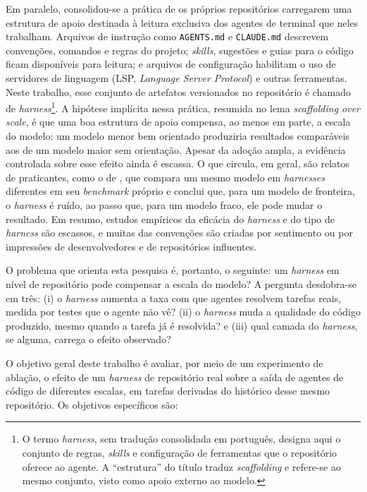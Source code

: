 Em paralelo, consolidou-se a prática de os próprios repositórios carregarem uma
estrutura de apoio destinada à leitura exclusiva dos agentes de terminal que neles trabalham. Arquivos de instrução
como \texttt{AGENTS.md} \cite{agentsmd2025} e \texttt{CLAUDE.md}
\cite{anthropic2025bestpractices} descrevem convenções, comandos e regras do
projeto; \textit{skills}, sugestões e guias para o código ficam disponíveis para leitura; e arquivos de configuração habilitam o uso de servidores de linguagem (LSP,
\textit{Language Server Protocol}) e outras ferramentas. Neste trabalho, esse
conjunto de artefatos versionados no repositório é chamado de
\textit{harness}\footnote{O termo \textit{harness}, sem tradução consolidada em
português, designa aqui o conjunto de regras, \textit{skills} e configuração de
ferramentas que o repositório oferece ao agente. A ``estrutura'' do título
traduz \textit{scaffolding} e refere-se ao mesmo conjunto, visto como apoio
externo ao modelo.}. A hipótese implícita nessa prática, resumida no
lema \textit{scaffolding over scale}, é que uma boa estrutura de apoio compensa,
ao menos em parte, a escala do modelo: um modelo menor bem orientado produziria
resultados comparáveis aos de um modelo maior sem orientação. Apesar da adoção
ampla, a evidência controlada sobre esse efeito ainda é escassa. O que
circula, em geral, são relatos de praticantes, como o de
, que compara um mesmo modelo em \textit{harnesses}
diferentes em seu \textit{benchmark} próprio e conclui que, para um modelo de
fronteira, o \textit{harness} é ruído, ao passo que, para um modelo fraco, ele
pode mudar o resultado. Em resumo, estudos empíricos da eficácia do \textit{harness} e do tipo de \textit{harness} são escassos, e muitas das convenções são criadas por sentimento ou por impressões de desenvolvedores e de repositórios influentes.

O problema que orienta esta pesquisa é, portanto, o seguinte: um
\textit{harness} em nível de repositório pode compensar a escala do modelo? A
pergunta desdobra-se em três: (i) o \textit{harness} aumenta a taxa com que
agentes resolvem tarefas reais, medida por testes que o agente não vê?
(ii) o \textit{harness} muda a qualidade do código produzido, mesmo quando a
tarefa já é resolvida? e (iii) qual camada do \textit{harness}, se alguma,
carrega o efeito observado?

O objetivo geral deste trabalho é avaliar, por meio de um experimento de
ablação, o efeito de um \textit{harness} de repositório real sobre a saída de
agentes de código de diferentes escalas, em tarefas derivadas do histórico
desse mesmo repositório. Os objetivos específicos são:

